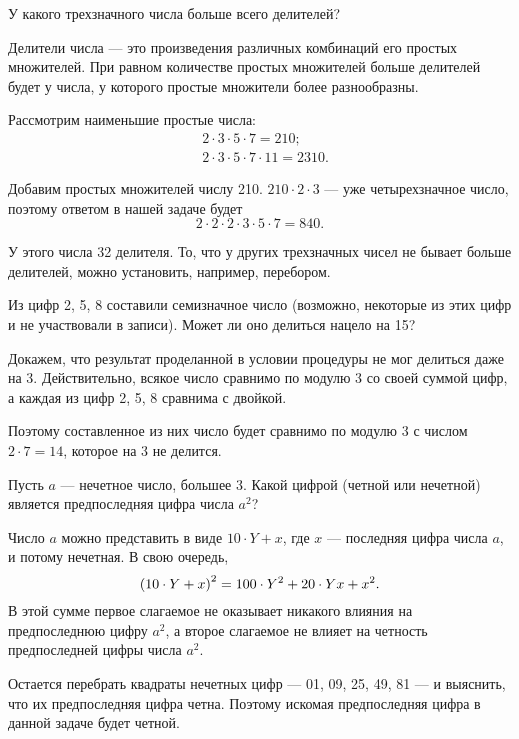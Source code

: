 \begin{itemize}

	\itA У какого трехзначного числа больше всего делителей?
	
	\itr
	Делители числа — это произведения различных комбинаций его простых множителей. При равном количестве простых множителей больше делителей будет у числа, у которого простые множители более разнообразны.
	
	Рассмотрим наименьшие простые числа:
	\begin{align*}
		& 2 \cdot 3 \cdot 5 \cdot 7 = 210;\\
		& 2 \cdot 3 \cdot 5 \cdot 7 \cdot 11 = 2310.
	\end{align*}
	
	Добавим простых множителей числу 210. $210 \cdot 2 \cdot 3$ — уже четырехзначное число, поэтому ответом в нашей задаче будет
	$$2 \cdot 2 \cdot 2 \cdot 3 \cdot 5 \cdot 7 = 840.$$
	
	У этого числа 32 делителя. То, что у других трехзначных чисел не бывает больше делителей, можно установить, например, перебором.
	
	\itB Из цифр 2, 5, 8 составили семизначное число (возможно, некоторые из этих цифр и не участвовали в записи). Может ли оно делиться нацело на 15?
	
	\itr Докажем, что результат проделанной в условии процедуры не мог делиться даже на 3. Действительно, всякое число сравнимо по модулю 3 со своей суммой цифр, а каждая из цифр 2, 5, 8 сравнима с двойкой.
	
	Поэтому составленное из них число будет сравнимо по модулю 3 с числом $2 \cdot 7 = 14$, которое на 3 не делится.
	
	\itC Пусть $a$ — нечетное число, большее 3. Какой цифрой (четной или нечетной) является предпоследняя цифра числа $a^2$?
	
	\itr Число $a$ можно представить в виде $10 \cdot Y + x$, где $x$ — последняя цифра числа $a$, и потому нечетная. В свою очередь,
	$$\left( 10 \cdot Y + x\right)^2 = 100 \cdot Y^2 + 20 \cdot Yx + x^2.$$
	В этой сумме первое слагаемое не оказывает никакого влияния на предпоследнюю цифру $a^2$, а второе слагаемое не влияет на четность предпоследней цифры числа $a^2$.
	
	Остается перебрать квадраты нечетных цифр — 01, 09, 25, 49, 81 — и выяснить, что их предпоследняя цифра четна. Поэтому искомая предпоследняя цифра в данной задаче будет четной.

\end{itemize}

